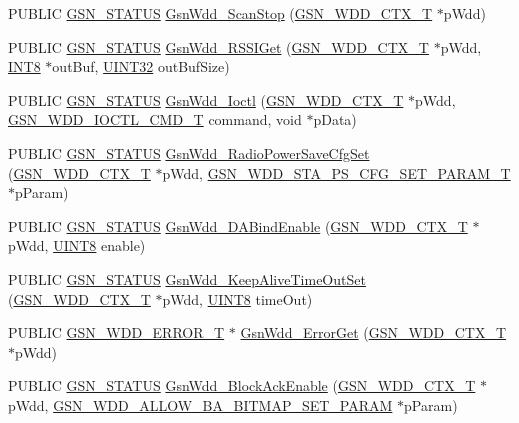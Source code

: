 \begin{DoxyCompactItemize}
\item 
PUBLIC \hyperlink{a00660_gada5951904ac6110b1fa95e51a9ddc217}{GSN\_\-STATUS} \hyperlink{a00603_ac13b223cd0f637a13bd2b34027d76c3d}{GsnWdd\_\-ScanStop} (\hyperlink{a00108}{GSN\_\-WDD\_\-CTX\_\-T} $\ast$pWdd)
\item 
PUBLIC \hyperlink{a00660_gada5951904ac6110b1fa95e51a9ddc217}{GSN\_\-STATUS} \hyperlink{a00603_a5d3978505772ece92b7dcfc4e51aa4d0}{GsnWdd\_\-RSSIGet} (\hyperlink{a00108}{GSN\_\-WDD\_\-CTX\_\-T} $\ast$pWdd, \hyperlink{a00660_ga307b8734c020247f6bac4fcde0dcfbb9}{INT8} $\ast$outBuf, \hyperlink{a00660_gae1e6edbbc26d6fbc71a90190d0266018}{UINT32} outBufSize)
\item 
PUBLIC \hyperlink{a00660_gada5951904ac6110b1fa95e51a9ddc217}{GSN\_\-STATUS} \hyperlink{a00603_a7d1f545c22995f6cbc6d37e9ab126aa1}{GsnWdd\_\-Ioctl} (\hyperlink{a00108}{GSN\_\-WDD\_\-CTX\_\-T} $\ast$pWdd, \hyperlink{a00670_ga0c5055a50e14741ff0accb7d8d5bf039}{GSN\_\-WDD\_\-IOCTL\_\-CMD\_\-T} command, void $\ast$pData)
\item 
PUBLIC \hyperlink{a00660_gada5951904ac6110b1fa95e51a9ddc217}{GSN\_\-STATUS} \hyperlink{a00603_a7c2b370d2b3fa77d9a12992cd9aafc17}{GsnWdd\_\-RadioPowerSaveCfgSet} (\hyperlink{a00108}{GSN\_\-WDD\_\-CTX\_\-T} $\ast$pWdd, \hyperlink{a00403}{GSN\_\-WDD\_\-STA\_\-PS\_\-CFG\_\-SET\_\-PARAM\_\-T} $\ast$pParam)
\item 
PUBLIC \hyperlink{a00660_gada5951904ac6110b1fa95e51a9ddc217}{GSN\_\-STATUS} \hyperlink{a00603_adc82e00ab52191428f5db1683a068574}{GsnWdd\_\-DABindEnable} (\hyperlink{a00108}{GSN\_\-WDD\_\-CTX\_\-T} $\ast$pWdd, \hyperlink{a00660_gab27e9918b538ce9d8ca692479b375b6a}{UINT8} enable)
\item 
PUBLIC \hyperlink{a00660_gada5951904ac6110b1fa95e51a9ddc217}{GSN\_\-STATUS} \hyperlink{a00603_ae7058a871bec3a0765a01d4754053453}{GsnWdd\_\-KeepAliveTimeOutSet} (\hyperlink{a00108}{GSN\_\-WDD\_\-CTX\_\-T} $\ast$pWdd, \hyperlink{a00660_gab27e9918b538ce9d8ca692479b375b6a}{UINT8} timeOut)
\item 
PUBLIC \hyperlink{a00274}{GSN\_\-WDD\_\-ERROR\_\-T} $\ast$ \hyperlink{a00603_a4b1230e5716f48262fda980639dc3006}{GsnWdd\_\-ErrorGet} (\hyperlink{a00108}{GSN\_\-WDD\_\-CTX\_\-T} $\ast$pWdd)
\item 
PUBLIC \hyperlink{a00660_gada5951904ac6110b1fa95e51a9ddc217}{GSN\_\-STATUS} \hyperlink{a00603_ad5dc85a2029754dd8c2cf76f1496c7cc}{GsnWdd\_\-BlockAckEnable} (\hyperlink{a00108}{GSN\_\-WDD\_\-CTX\_\-T} $\ast$pWdd, \hyperlink{a00365}{GSN\_\-WDD\_\-ALLOW\_\-BA\_\-BITMAP\_\-SET\_\-PARAM} $\ast$pParam)

\end{DoxyCompactItemize}
